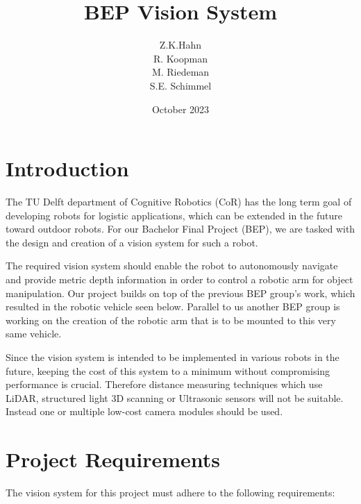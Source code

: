 \documentclass{article}[a4paper]
\title{BEP Vision System}
\author{Z.K.Hahn \\ R. Koopman \\ M. Riedeman \\ S.E. Schimmel}
\date{October 2023}
\begin{document}
\maketitle
\newpage
\section{Introduction}
The TU Delft department of Cognitive Robotics (CoR) has the long term goal of developing robots for logistic applications, which can be extended in the future toward outdoor robots. For our Bachelor Final Project (BEP), we are tasked with the design and creation of a vision system for such a robot.

The required vision system should enable the robot to autonomously navigate and provide metric depth information in order to control a robotic arm for object manipulation. Our project builds on top of the previous BEP group's work, which resulted in the robotic vehicle seen below. Parallel to us another BEP group is working on the creation of the robotic arm that is to be mounted to this very same vehicle.

Since the vision system is intended to be implemented in various robots in the future, keeping the cost of this system to a minimum without compromising performance is crucial. Therefore distance measuring techniques which use LiDAR, structured light 3D scanning or Ultrasonic sensors will not be suitable. Instead one or multiple low-cost camera modules should be used.

\newpage

\section{Project Requirements}
The vision system for this project must adhere to the following requirements:
\end{document}
